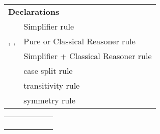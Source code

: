 \begin{isabellebody}
\begin{isamarkuptext}
\begin{tabular}{ll}
    \multicolumn{2}{l}{\textbf{Declarations}} \\[0.5ex]
    \hyperlink{attribute.simp}{\mbox{\isa{simp}}} & Simplifier rule \\
    \hyperlink{attribute.intro}{\mbox{\isa{intro}}}, \hyperlink{attribute.elim}{\mbox{\isa{elim}}}, \hyperlink{attribute.dest}{\mbox{\isa{dest}}} & Pure or Classical Reasoner rule \\
    \hyperlink{attribute.iff}{\mbox{\isa{iff}}} & Simplifier + Classical Reasoner rule \\
    \hyperlink{attribute.split}{\mbox{\isa{split}}} & case split rule \\
    \hyperlink{attribute.trans}{\mbox{\isa{trans}}} & transitivity rule \\
    \hyperlink{attribute.sym}{\mbox{\isa{sym}}} & symmetry rule \\
  \end{tabular}%
\end{isamarkuptext}%
\isamarkuptrue%
%
\isamarkuptrue%
%
\begin{isamarkuptext}%
\begin{tabular}{l|lllll}
      & \hyperlink{method.rule}{\mbox{\isa{rule}}} & \hyperlink{method.iprover}{\mbox{\isa{iprover}}} & \hyperlink{method.blast}{\mbox{\isa{blast}}} & \hyperlink{method.simp}{\mbox{\isa{simp}}} & \hyperlink{method.auto}{\mbox{\isa{auto}}} \\
      &                &                   & \hyperlink{method.fast}{\mbox{\isa{fast}}} & \hyperlink{method.simp-all}{\mbox{\isa{simp{\isaliteral{5F}{\isacharunderscore}}all}}} & \hyperlink{method.force}{\mbox{\isa{force}}} \\
    \hline
    \hyperlink{attribute.Pure.elim}{\mbox{\isa{Pure{\isaliteral{2E}{\isachardot}}elim}}}\isa{{\isaliteral{22}{\isachardoublequote}}{\isaliteral{21}{\isacharbang}}{\isaliteral{22}{\isachardoublequote}}} \hyperlink{attribute.Pure.intro}{\mbox{\isa{Pure{\isaliteral{2E}{\isachardot}}intro}}}\isa{{\isaliteral{22}{\isachardoublequote}}{\isaliteral{21}{\isacharbang}}{\isaliteral{22}{\isachardoublequote}}}
      & \isa{{\isaliteral{22}{\isachardoublequote}}{\isaliteral{5C3C74696D65733E}{\isasymtimes}}{\isaliteral{22}{\isachardoublequote}}}    & \isa{{\isaliteral{22}{\isachardoublequote}}{\isaliteral{5C3C74696D65733E}{\isasymtimes}}{\isaliteral{22}{\isachardoublequote}}} \\
    \hyperlink{attribute.Pure.elim}{\mbox{\isa{Pure{\isaliteral{2E}{\isachardot}}elim}}} \hyperlink{attribute.Pure.intro}{\mbox{\isa{Pure{\isaliteral{2E}{\isachardot}}intro}}}

\end{tabular}
\end{isamarkuptext}
\end{isabellebody}

